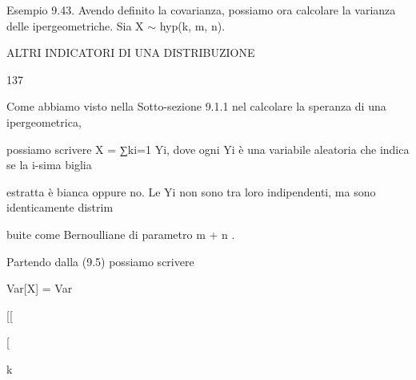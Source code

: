 \documentclass[a4paper,portrait,12pt]{article}
\begin{document}
\begin{flushleft}
Esempio 9.43. Avendo definito la covarianza, possiamo ora calcolare la varianza delle ipergeometriche. Sia X $\sim$ hyp(k, m, n).
\end{flushleft}





\begin{flushleft}
 ALTRI INDICATORI DI UNA DISTRIBUZIONE
\end{flushleft}





137





\begin{flushleft}
Come abbiamo visto nella Sotto-sezione 9.1.1 nel calcolare la speranza di una ipergeometrica,
\end{flushleft}


\begin{flushleft}
possiamo scrivere X = ∑ki=1 Yi, dove ogni Yi \`{e} una variabile aleatoria che indica se la i-sima biglia
\end{flushleft}


\begin{flushleft}
estratta \`{e} bianca oppure no. Le Yi non sono tra loro indipendenti, ma sono identicamente distrim
\end{flushleft}


\begin{flushleft}
buite come Bernoulliane di parametro m + n .
\end{flushleft}


\begin{flushleft}
Partendo dalla (9.5) possiamo scrivere
\end{flushleft}


\begin{flushleft}
Var[X] = Var
\end{flushleft}





[[


[





\begin{flushleft}
k
\end{flushleft}
\end{document}
